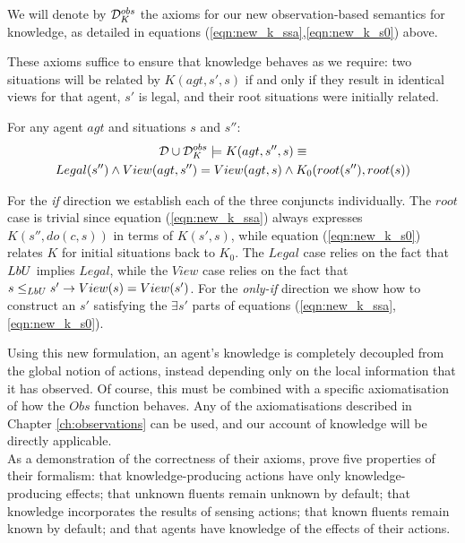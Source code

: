 \begin{defn}
We will denote by $\mathcal{D}_{K}^{obs}$ the axioms for our new observation-based
semantics for knowledge, as detailed in equations (\ref{eqn:new_k_ssa},\ref{eqn:new_k_s0})
above. 
\end{defn}
These axioms suffice to ensure that knowledge behaves as we require:
two situations will be related by $K(agt,s',s)$ if and only if they
result in identical views for that agent, $s'$ is legal, and their
root situations were initially related. 
\begin{thm}
\label{thm:k_obs_equiv} For any agent $agt$ and situations $s$
and $s''$:\begin{multline*}
\mathcal{D}\cup\mathcal{D}_{K}^{obs}\models K(agt,s'',s)\equiv\\
Legal(s'')\wedge View(agt,s'')=View(agt,s)\wedge K_{0}(root(s''),root(s))\end{multline*}
 \end{thm}
\begin{proofsketch}
For the \emph{if} direction we establish each of the three conjuncts
individually. The $root$ case is trivial since equation (\ref{eqn:new_k_ssa})
always expresses $K(s'',do(c,s))$ in terms of $K(s',s)$, while equation
(\ref{eqn:new_k_s0}) relates $K$ for initial situations back to
$K_{0}$. The $Legal$ case relies on the fact that $LbU$ implies
$Legal$, while the $View$ case relies on the fact that $s\leq_{LbU}s'\rightarrow View(s)=View(s')$.
For the \emph{only-if} direction we show how to construct an $s'$
satisfying the $\exists s'$ parts of equations (\ref{eqn:new_k_ssa},\ref{eqn:new_k_s0}). 
\end{proofsketch}
Using this new formulation, an agent's knowledge is completely decoupled
from the global notion of actions, instead depending only on the local
information that it has observed. Of course, this must be combined
with a specific axiomatisation of how the $Obs$ function behaves.
Any of the axiomatisations described in Chapter \ref{ch:observations}
can be used, and our account of knowledge will be directly applicable.\\


As a demonstration of the correctness of their axioms, \citet{scherl03sc_knowledge}
prove five properties of their formalism: that knowledge-producing
actions have only knowledge-producing effects; that unknown fluents
remain unknown by default; that knowledge incorporates the results
of sensing actions; that known fluents remain known by default; and
that agents have knowledge of the effects of their actions.


